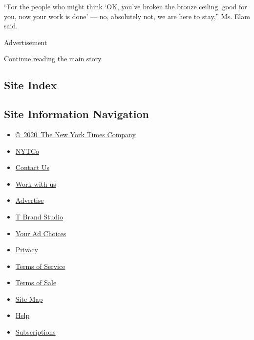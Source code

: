 ``For the people who might think `OK, you've broken the bronze ceiling,
good for you, now your work is done' --- no, absolutely not, we are here
to stay,'' Ms. Elam said.

Advertisement

\protect\hyperlink{after-bottom}{Continue reading the main story}

\hypertarget{site-index}{%
\subsection{Site Index}\label{site-index}}

\hypertarget{site-information-navigation}{%
\subsection{Site Information
Navigation}\label{site-information-navigation}}

\begin{itemize}
\tightlist
\item
  \href{https://help.nytimes.com/hc/en-us/articles/115014792127-Copyright-notice}{©~2020~The
  New York Times Company}
\end{itemize}

\begin{itemize}
\tightlist
\item
  \href{https://www.nytco.com/}{NYTCo}
\item
  \href{https://help.nytimes.com/hc/en-us/articles/115015385887-Contact-Us}{Contact
  Us}
\item
  \href{https://www.nytco.com/careers/}{Work with us}
\item
  \href{https://nytmediakit.com/}{Advertise}
\item
  \href{http://www.tbrandstudio.com/}{T Brand Studio}
\item
  \href{https://www.nytimes.com/privacy/cookie-policy\#how-do-i-manage-trackers}{Your
  Ad Choices}
\item
  \href{https://www.nytimes.com/privacy}{Privacy}
\item
  \href{https://help.nytimes.com/hc/en-us/articles/115014893428-Terms-of-service}{Terms
  of Service}
\item
  \href{https://help.nytimes.com/hc/en-us/articles/115014893968-Terms-of-sale}{Terms
  of Sale}
\item
  \href{https://spiderbites.nytimes.com}{Site Map}
\item
  \href{https://help.nytimes.com/hc/en-us}{Help}
\item
  \href{https://www.nytimes.com/subscription?campaignId=37WXW}{Subscriptions}
\end{itemize}
